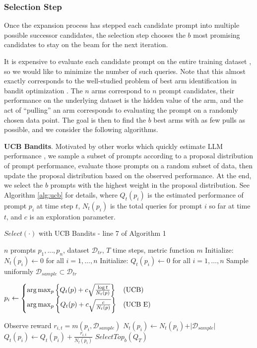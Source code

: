 \subsubsection{Selection Step}
\label{sec:beamselection}
Once the expansion process has stepped each candidate prompt into multiple possible successor candidates, the selection step chooses the $b$ most promising candidates to stay on the beam for the next iteration.

It is expensive to evaluate each candidate prompt on the entire training dataset \cite{prasad2022grips}, so we would like to minimize the number of such queries. Note that this almost exactly corresponds to the well-studied problem of best arm identification in bandit optimization \cite{audibert2010best}. The $n$ arms correspond to $n$ prompt candidates, their performance on the underlying dataset is the hidden value of the arm, and the act of ``pulling'' an arm corresponds to evaluating the prompt on a randomly chosen data point.
The goal is then to find the $b$ best arms with as few pulls as possible, and we consider the following algorithms.

\textbf{UCB Bandits}. Motivated by other works which quickly estimate LLM performance \cite{li2022competition,zhou2022large}, we sample a subset of prompts according to a proposal distribution of prompt performance, evaluate those prompts on a random subset of data, then update the proposal distribution based on the observed performance. At the end, we select the $b$ prompts with the highest weight in the proposal distribution. See Algorithm \ref{alg:ucb} for details, where $Q_t(p_i)$ is the estimated performance of prompt $p_i$ at time step $t$, $N_t(p_i)$ is the total queries for prompt $i$ so far at time $t$, and $c$ is an exploration parameter.

\begin{small}
\begin{algorithm}
\caption{$Select(\cdot)$ with UCB Bandits - line 7 of Algorithm 1}
\label{alg:ucb}
\begin{algorithmic}[1]
\REQUIRE $n$ prompts $p_1, ..., p_n$, dataset $\mathcal{D}_{tr}$, $T$ time steps, metric function $m$
\STATE Initialize: $N_t(p_i) \gets 0$ for all $i = 1, \dots, n$
\STATE Initialize: $Q_t(p_i) \gets 0$ for all $i = 1, \dots, n$
    \STATE Sample uniformly $\mathcal{D}_{sample} \subset \mathcal{D}_{tr}$
    \STATE \begin{small}$p_i \leftarrow \left\{\begin{array}{@{}l@{\quad}l}
\arg\max_p \left\{Q_t(p) + c \sqrt{\frac{\log t}{N_t(p)}}\right\} & \mathrm{(UCB)}\\
\arg\max_p \left\{Q_t(p) + c \sqrt{\frac{c}{N_t(p)}}\right\} & \mathrm{(UCB\ E)}
\end{array}\right.$\end{small}
    \STATE Observe reward $r_{i,t} = m(p_i, \mathcal{D}_{sample})$
    \STATE $N_t(p_i) \gets N_t(p_i) + \vert \mathcal{D}_{sample} \vert$
    \STATE $Q_t(p_i) \gets Q_t(p_i) + \frac{r_{i, t}}{N_t(p_i)}$
\ENDFOR
\RETURN $SelectTop_b(Q_T)$
\end{algorithmic}
\end{algorithm}
\end{small}

